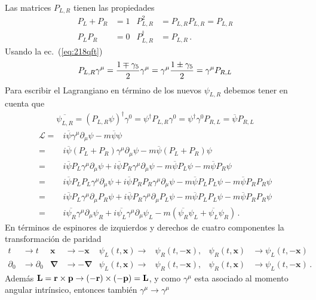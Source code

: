 Las matrices $P_{L,R}$ tienen las propiedades
\begin{align}
  P_L+P_R&=1 & P_{L,R}^2&=P_{L,R}P_{L,R}=P_{L,R}\nonumber\\
  P_L P_R&=0& P_{L,R}^\dagger&=P_{L,R}\,.
\end{align}
Usando la ec.~(\ref{eq:218qft})
\begin{align}
  P_{L,R}\gamma^\mu=\frac{1\mp\gamma_5}{2}\gamma^\mu=\gamma^\mu\frac{1\pm\gamma_5}{2}=\gamma^\mu P_{R,L}
\end{align}
Para escribir el Lagrangiano en término de los nuevos $\psi_{L,R}$ debemos tener en cuenta que
\begin{align}
  \overline{\psi_{L,R}}=(P_{L,R}\psi)^\dagger\gamma^0=\psi^\dagger P_{L,R}\gamma^0=\psi^\dagger\gamma^0P_{R,L}=\overline{\psi}P_{R,L}
\end{align}
\begin{align}
  \label{eq:221qft}
  \mathcal{L}=&i\overline{\psi}\gamma^\mu\partial_\mu\psi-m\overline{\psi}\psi\nonumber\\
  =&i\overline{\psi}(P_L+P_R)\gamma^\mu\partial_\mu\psi-m\overline{\psi}(P_L+P_R)\psi\nonumber\\
  =&i\overline{\psi}P_L\gamma^\mu\partial_\mu\psi+i\overline{\psi}P_R\gamma^\mu\partial_\mu\psi-m\overline{\psi}P_L\psi-m\overline{\psi}P_R\psi\nonumber\\
  =&i\overline{\psi}P_L P_L\gamma^\mu\partial_\mu\psi+i\overline{\psi}P_R P_R\gamma^\mu\partial_\mu\psi-m\overline{\psi}P_L P_L\psi-m\overline{\psi}P_R P_R\psi\nonumber\\
  =&i\overline{\psi}P_L\gamma^\mu\partial_\mu P_R\psi+i\overline{\psi}P_R\gamma^\mu\partial_\mu P_L\psi-m\overline{\psi}P_L P_L\psi-m\overline{\psi}P_R P_R\psi\nonumber\\
  =&i\overline{\psi_R}\gamma^\mu\partial_\mu\psi_R+i\overline{\psi_L}\gamma^\mu\partial_\mu\psi_L-m(\overline{\psi_R}\psi_L+\overline{\psi_L}\psi_R)\,.
\end{align}
En términos de espinores de izquierdos y derechos de cuatro componentes la transformación de paridad 
\begin{align}
  \label{eq:220qft}
  t&\to t&\mathbf{x}&\to -\mathbf{x}&\psi_L(t,\mathbf{x})\to&\psi_R(t,-\mathbf{x}),& \psi_R(t,\mathbf{x})&\to\psi_L(t,-\mathbf{x})\nonumber\\
  \partial_0&\to \partial_0&\boldsymbol{\nabla}&\to -\boldsymbol{\nabla}&\psi_L(t,\mathbf{x})\to&\psi_R(t,-\mathbf{x}),& \psi_R(t,\mathbf{x})&\to\psi_L(t,-\mathbf{x})\,.
\end{align}
Además $\mathbf{L}=\mathbf{r}\times \mathbf{p}\to(-\mathbf{r})\times (-\mathbf{p})=\mathbf{L}$, y como $\gamma^\mu$ esta asociado al momento angular intrínsico, entonces también $\gamma^\mu\to\gamma^\mu$


